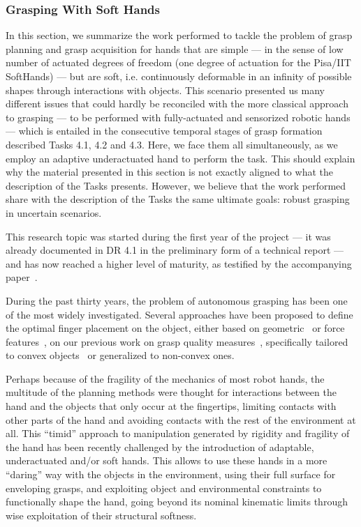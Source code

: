 
\subsubsection{Grasping With Soft Hands}
\label{sec:GraspingWithSoftHands}
In this section, we summarize the work performed to tackle the problem of grasp planning and grasp acquisition for hands that are simple --- in the sense of low number of actuated degrees of freedom (one degree of actuation for the Pisa/IIT SoftHands) --- but are soft, i.e. continuously deformable in an infinity of possible shapes through interactions with objects. This scenario presented us many different issues that could hardly be reconciled with the more classical approach to grasping --- to be performed with fully-actuated and sensorized robotic hands --- which is entailed in the consecutive temporal stages of grasp formation described Tasks 4.1, 4.2 and 4.3. Here, we face them all simultaneously, as we employ an adaptive underactuated hand to perform the task. This should explain why the material presented in this section is not exactly aligned to what the description of the Tasks presents. However, we believe that the work performed share with the description of the Tasks the same ultimate goals: robust grasping in uncertain scenarios.

 This research topic was started during the first year of the project --- it was already documented in DR 4.1 in the preliminary form of a technical report --- and has now reached a higher level of maturity, as testified by the accompanying paper~\cite{Bonilla:Humanoids:2015}.

During the past thirty years, the problem of autonomous grasping has been one of the most widely investigated. Several approaches have been proposed to define the optimal finger placement on the object, either based on geometric~\cite{Ferrari:1992eb} or force features~\cite{Prattichizzo:1997vf}, on our previous work on grasp quality measures~\cite{Rosales:2012fg}, specifically tailored to convex objects~\cite{Teichmann:1994ca} or generalized to non-convex ones. 

Perhaps because of the fragility of the mechanics of most robot hands, the multitude of the planning methods were thought for interactions between the hand and the objects that only occur at the fingertips, limiting contacts with other parts of the hand and avoiding contacts with the rest of the environment at all. This ``timid'' approach to manipulation generated by rigidity and fragility of the hand has been recently challenged by the introduction of adaptable, underactuated and/or soft hands. This allows to use these hands in a more ``daring'' way with the objects in the environment, using their full surface for enveloping grasps, and exploiting object and environmental constraints to functionally shape the hand, going beyond its nominal kinematic limits through wise exploitation of their structural softness.

